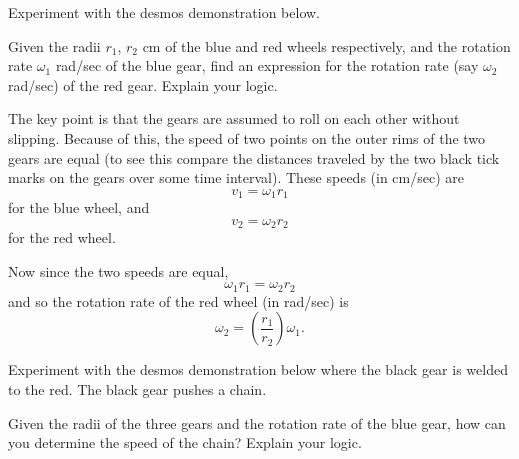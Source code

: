 \documentclass{ximera}
\begin{document}
\begin{question}  \label{Q3242:Angles}
Experiment with the desmos demonstration below. 

Given the radii $r_1$, $r_2$ cm of the blue and red wheels respectively, and the rotation rate $\omega_1$ rad/sec of the blue gear, find an expression for the rotation rate (say $\omega_2$ rad/sec) of the red gear. Explain your logic.

 
\begin{onlineOnly}
    \begin{center}
\end{center}
\end{onlineOnly}


\begin{hint}
The key point is that the gears are assumed to roll on each other without slipping. Because of this, the speed of two points on the outer rims of the two gears are equal (to see this compare the distances traveled by the two black tick marks on the gears over some time interval). These speeds (in cm/sec) are 
\[
   v_1 = \omega_1 r_1
\]
for the blue wheel, and
\[
   v_2 = \omega_2 r_2
\]
for the red wheel.

Now since the two speeds are equal,
\[
   \omega_1 r_1 = \omega_2 r_2
\]
and so the rotation rate of the red wheel (in rad/sec) is
\[
  \omega_2 = \left( \frac{r_1}{r_2} \right) \omega_1 .
\]
\end{hint}

\end{question}




\begin{question}  \label{Q1764:Angles}
Experiment with the desmos demonstration below where the black gear is welded to the red. The black gear pushes a chain.  

Given the radii of the three gears and the rotation rate of the blue gear, how can you determine the speed of the chain? Explain your logic.

 
\begin{onlineOnly}
    \begin{center}
\end{center}
\end{onlineOnly}
\end{question}
\end{document}
